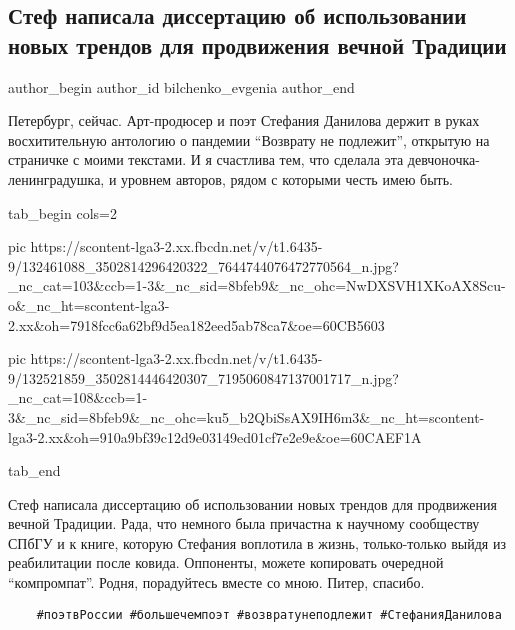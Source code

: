 
 
 
 
 
 
\subsection{Стеф написала диссертацию об использовании новых трендов для продвижения вечной Традиции}
\label{sec:24_12_2020.fb.bilchenko_evgenia.2.stefania_danilova}
\ifcmt
 author_begin
   author_id bilchenko_evgenia
 author_end
\fi

Петербург, сейчас. Арт-продюсер и поэт Стефания Данилова держит в руках
восхитительную антологию о пандемии \enquote{Возврату не подлежит}, открытую на
страничке с моими текстами. И я счастлива тем, что сделала эта
девчоночка-ленинградушка, и уровнем авторов, рядом с которыми честь имею быть.

\ifcmt
  tab_begin cols=2

     pic https://scontent-lga3-2.xx.fbcdn.net/v/t1.6435-9/132461088_3502814296420322_7644744076472770564_n.jpg?_nc_cat=103&ccb=1-3&_nc_sid=8bfeb9&_nc_ohc=NwDXSVH1XKoAX8Scu-o&_nc_ht=scontent-lga3-2.xx&oh=7918fcc6a62bf9d5ea182eed5ab78ca7&oe=60CB5603

     pic https://scontent-lga3-2.xx.fbcdn.net/v/t1.6435-9/132521859_3502814446420307_7195060847137001717_n.jpg?_nc_cat=108&ccb=1-3&_nc_sid=8bfeb9&_nc_ohc=ku5_b2QbiSsAX9IH6m3&_nc_ht=scontent-lga3-2.xx&oh=910a9bf39c12d9e03149ed01cf7e2e9e&oe=60CAEF1A

  tab_end
\fi

Стеф написала диссертацию об использовании новых трендов для продвижения вечной
Традиции. Рада, что немного была причастна к научному сообществу СПбГУ и к
книге, которую Стефания воплотила в жизнь, только-только выйдя из реабилитации
после ковида. Оппоненты, можете копировать очередной \enquote{компромпат}. Родня,
порадуйтесь вместе со мною. Питер, спасибо. 

\begin{verbatim}
	#поэтвРоссии #большечемпоэт #возвратунеподлежит #СтефанияДанилова
\end{verbatim}
